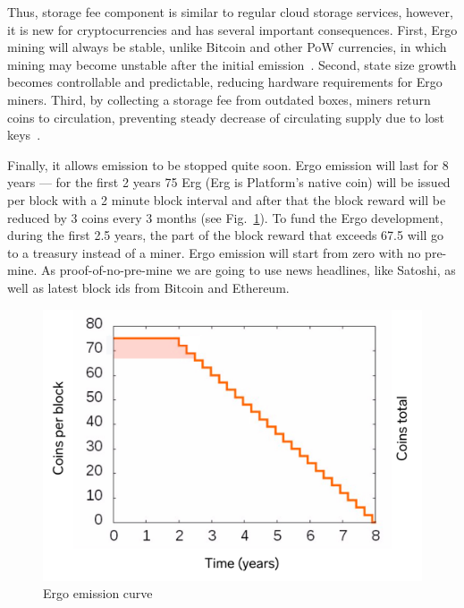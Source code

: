 \documentclass[]{article}
\begin{document}
    Thus, storage fee component is similar to regular cloud storage services, however, it is new for
    cryptocurrencies and has several important consequences. First, Ergo mining will always be
    stable, unlike Bitcoin and other PoW currencies, in which mining may become unstable after the
    initial emission~\cite{carlsten2016instability}. Second, state size growth becomes controllable and predictable,
    reducing hardware requirements for Ergo miners. Third, by collecting a storage fee from outdated boxes,
    miners return coins to circulation, preventing steady decrease of circulating supply due to lost
    keys~\cite{wsj2018}.

    Finally, it allows emission to be stopped quite soon. Ergo emission will
    last for 8 years --- for the
    first 2 years 75 Erg (Erg is Platform's native coin) will be issued per block with a 2 minute block
    interval and after that the block reward will be reduced by 3 coins every 3 months (see Fig.~\ref{fig:emission}).
    To fund the Ergo development, during the first 2.5 years, the part of the block reward that
    exceeds 67.5 will go to a treasury instead of a miner. Ergo emission will start from zero with no
    pre-mine. As proof-of-no-pre-mine we are going to use news headlines, like Satoshi, as well as
    latest block ids from Bitcoin and Ethereum.

    \begin{figure}[H]
        \centering
        \includegraphics[width=\textwidth]{emission.jpg}
        \caption{Ergo emission curve
        \label{fig:emission} }
    \end{figure}
\end{document}
